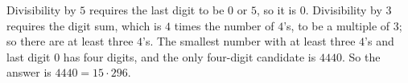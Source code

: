 Divisibility by $5$ requires the last digit to be $0$ or $5$, so it is $0$. Divisibility by $3$ requires the digit sum, which is $4$ times the number of $4$'s, to be a multiple of $3$; so there are at least three $4$'s. The smallest number with at least three $4$'s and last digit $0$ has four digits, and the only four-digit candidate is $4440$. So the answer is $\boxed{4440}=15\cdot296$.
